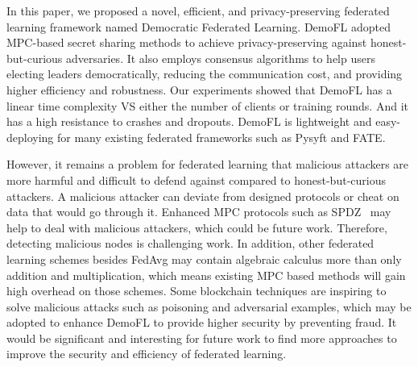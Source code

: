 In this paper, we proposed a novel, efficient, and privacy-preserving federated learning framework named Democratic Federated Learning. DemoFL adopted MPC-based secret sharing methods to achieve privacy-preserving against honest-but-curious adversaries. It also employs consensus algorithms to help users electing leaders democratically, reducing the communication cost, and providing higher efficiency and robustness. Our experiments showed that DemoFL has a linear time complexity VS either the number of clients or training rounds. And it has a high resistance to crashes and dropouts. DemoFL is lightweight and easy-deploying for many existing federated frameworks such as Pysyft and FATE.

However, it remains a problem for federated learning that malicious attackers are more harmful and difficult to defend against compared to honest-but-curious attackers. A malicious attacker can deviate from designed protocols or cheat on data that would go through it. Enhanced MPC protocols such as SPDZ~\cite{SPDZ} may help to deal with malicious attackers, which could be future work. Therefore, detecting malicious nodes is challenging work. In addition, other federated learning schemes besides FedAvg may contain algebraic calculus more than only addition and multiplication, which means existing MPC based methods will gain high overhead on those schemes. Some blockchain techniques are inspiring to solve malicious attacks such as poisoning and adversarial examples, which may be adopted to enhance DemoFL to provide higher security by preventing fraud. It would be significant and interesting for future work to find more approaches to improve the security and efficiency of federated learning.